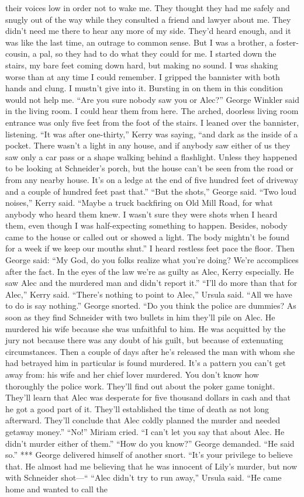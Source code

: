 \documentclass{novel}
\begin{document}
their voices low in order not to wake me. They thought they had me safely and snugly out of the way while they consulted a friend and lawyer about me. They didn’t need me there to hear any more of my side. They’d heard enough, and it was like the last time, an outrage to common sense. But I was a brother, a foster-cousin, a pal, so they had to do what they could for me. I started down the stairs, my bare feet coming down hard, but making no sound. I was shaking worse than at any time I could remember. I gripped the bannister with both hands and clung. I mustn’t give into it. Bursting in on them in this condition would not help me. “Are you sure nobody saw you or Alec?” George Winkler said in the living room. I could hear them from here. The arched, doorless living room entrance was only five feet from the foot of the stairs. I leaned over the bannister, listening. “It was after one-thirty,” Kerry was saying, “and dark as the inside of a pocket. There wasn’t a light in any house, and if anybody saw either of us they saw only a car pass or a shape walking behind a flashlight. Unless they happened to be looking at Schneider’s porch, but the house can’t be seen from the road or from any nearby house. It’s on a ledge at the end of five hundred feet of driveway and a couple of hundred feet past that.” “But the shots,” George said. “Two loud noises,” Kerry said. “Maybe a truck backfiring on Old Mill Road, for what anybody who heard them knew. I wasn’t sure they were shots when I heard them, even though I was half-expecting something to happen. Besides, nobody came to the house or called out or showed a light. The body mightn’t be found for a week if we keep our mouths shut.” I heard restless feet pace the floor. Then George said: “My God, do you folks realize what you’re doing? We’re accomplices after the fact. In the eyes of the law we’re as guilty as Alec, Kerry especially. He saw Alec and the murdered man and didn’t report it.” “I’ll do more than that for Alec,” Kerry said. “There’s nothing to point to Alec,” Ursula said. “All we have to do is say nothing.” George snorted. “Do you think the police are dummies? As soon as they find Schneider with two bullets in him they’ll pile on Alec. He murdered his wife because she was unfaithful to him. He was acquitted by the jury not because there was any doubt of his guilt, but because of extenuating circumstances. Then a couple of days after he’s released the man with whom she had betrayed him in particular is found murdered. It’s a pattern you can’t get away from: his wife and her chief lover murdered. You don’t know how thoroughly the police work. They’ll find out about the poker game tonight. They’ll learn that Alec was desperate for five thousand dollars in cash and that he got a good part of it. They’ll established the time of death as not long afterward. They’ll conclude that Alec coldly planned the murder and needed getaway money.” “No!” Miriam cried. “I can’t let you say that about Alec. He didn’t murder either of them.” “How do you know?” George demanded. “He said so.” *** George delivered himself of another snort. “It’s your privilege to believe that. He almost had me believing that he was innocent of Lily’s murder, but now with Schneider shot—“ “Alec didn’t try to run away,” Ursula said. “He came home and wanted to call the 
\end{document}
